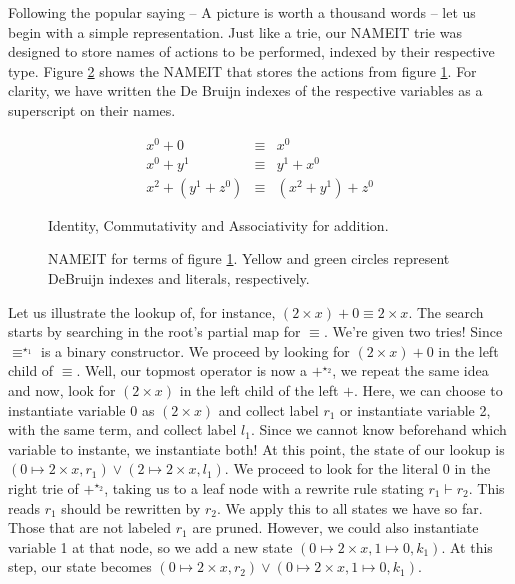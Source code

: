\newcommand{\mytrie}{NAMEIT }

Following the popular saying -- A picture is worth a thousand words -- let us begin
with a simple representation. Just like a trie, our \mytrie trie was designed to
store names of actions to be performed, indexed by their respective type. Figure 
\ref{fig:btrie1} shows the \mytrie that stores the actions from figure \ref{fig:trie1terms}.
For clarity, we have written the De Bruijn indexes of the respective variables as a superscript on
their names.

\begin{figure}[h]
\begin{eqnarray*}
  x^0 + 0 & \equiv & x^0 \\
  x^0 + y^1 & \equiv & y^1 + x^0 \\
  x^2 + (y^1 + z^0) & \equiv & (x^2 + y^1) + z^0
\end{eqnarray*}
\caption{Identity, Commutativity and Associativity for addition.}
\label{fig:trie1terms}
\end{figure}

\begin{figure}[h]

\caption{\mytrie for terms of figure \ref{fig:trie1terms}. Yellow and green circles represent DeBruijn indexes and literals, respectively.}
\label{fig:btrie1}
\end{figure}

Let us illustrate the lookup of, for instance, $(2 \times x) + 0 \equiv 2 \times x$.
The search starts by searching in the root's partial map for $\equiv$. We're given
two tries! Since $\equiv^{\star_1}$ is a binary constructor. We proceed by looking for $(2 \times x) + 0$
in the left child of $\equiv$. Well, our topmost operator is now a $+^{\star_2}$, we repeat the same idea and
now, look for $(2 \times x)$ in the left child of the left $+$. Here, we can choose
to instantiate variable 0 as $(2 \times x)$ and collect label $r_1$ or
instantiate variable 2, with the same term, and collect label $l_1$. Since we cannot know beforehand
which variable to instante, we instantiate both! At this point, the state of our lookup is
$(0 \mapsto 2 \times x , r_1) \vee (2 \mapsto 2 \times x , l_1)$.
We proceed to look for the literal $0$ in the right trie of $+^{\star_2}$, taking us to a leaf node with
a rewrite rule stating $r_1 \vdash r_2$. This reads $r_1$ should be rewritten by $r_2$. We apply
this to all states we have so far. Those that are not labeled $r_1$ are pruned. 
However, we could also instantiate variable 1 at that node, so
we add a new state $(0 \mapsto 2 \times x, 1 \mapsto 0 , k_1)$. At this step,
our state becomes $(0 \mapsto 2 \times x , r_2) \vee (0 \mapsto 2 \times x, 1 \mapsto 0 , k_1)$. 

